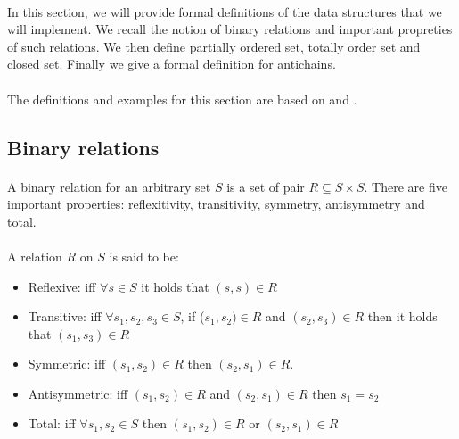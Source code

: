 \documentclass[letterpaper]{article}
\theoremstyle{definition}
\begin{document}
\label{data_structures}

\paragraph{}

In this section, we will provide formal definitions of the data
structures that we will implement. We recall the notion of binary relations
and important propreties of such relations.
We then define partially ordered set, totally order set and closed set.
Finally we give a formal definition for antichains.

\paragraph{}

The definitions and examples for this section are based on \cite{bohy_phd}
and \cite{maquet_phd}.


\subsection{Binary relations}

\paragraph{}

A binary relation for an arbitrary set $S$ is
a set of pair $R \subseteq S \times S$.
There are five important properties: reflexitivity, transitivity,
symmetry, antisymmetry and total.

\paragraph{}

A relation $R$ on $S$ is said to be:

\begin{itemize}
    \item Reflexive:
    iff $\forall s \in S$ it holds that $(s, s) \in R$
    \item Transitive:
    iff $\forall s_1, s_2, s_3 \in S$,
    if ($s_1, s_2) \in R$ and $(s_2, s_3) \in R$
    then it holds that $(s_1, s_3) \in R$
    \item Symmetric: iff $(s_1, s_2) \in R$ then $(s_2, s_1) \in R$.
    \item Antisymmetric: iff $(s_1, s_2) \in R$
    and $(s_2, s_1) \in R$ then $s_1 = s_2$
    \item Total: iff $\forall s_1, s_2 \in S$ then $(s_1, s_2) \in R$
    or $(s_2, s_1) \in R$

\end{itemize}
\end{document}
